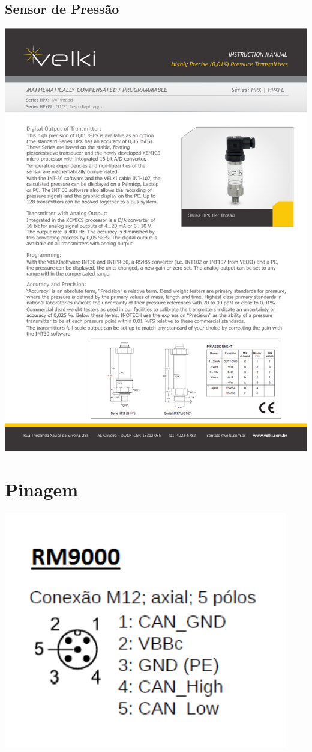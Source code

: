 \subsection{Sensor de Pressão}
\includegraphics[width=1\columnwidth]{figs/datasheets/profundimetro.pdf}

\section{Pinagem}
\includegraphics[width=1\columnwidth]{figs/datasheets/pinout.pdf}


